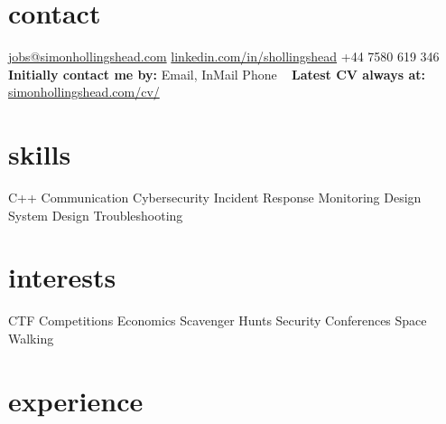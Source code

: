\documentclass[a4paper]{friggeri-cv} %
\begin{document}

\begin{aside} %
\section{contact}
\href{mailto:jobs@simonhollingshead.com}{\footnotesize{jobs@simonhollingshead.com}}
\href{https://linkedin.com/in/shollingshead}{\footnotesize{linkedin.com/in/shollingshead}}
+44 7580 619 346
~
{\textbf{Initially contact me by:}}
Email, InMail 
Phone 
~
{\textbf{Latest CV always at:}}
\href{https://simonhollingshead.com/cv/}{\footnotesize{simonhollingshead.com/cv/}}
~
\section{skills}
C++
Communication
Cybersecurity
Incident Response
Monitoring Design
System Design
Troubleshooting
~
\section{interests}
CTF Competitions
Economics
Scavenger Hunts
Security Conferences
Space
Walking
\end{aside}


\section{experience}
\end{document}
